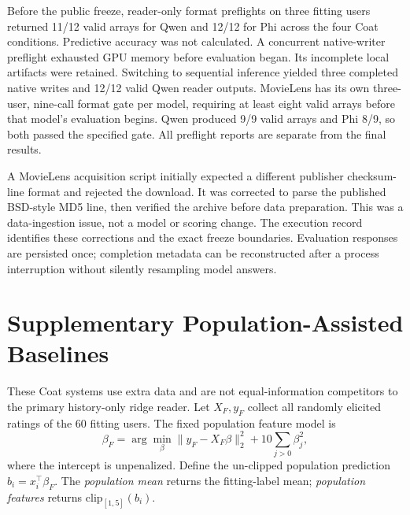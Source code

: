 Before the public freeze, reader-only format preflights on three fitting users returned 11/12 valid arrays for Qwen and 12/12 for Phi across the four Coat conditions. Predictive accuracy was not calculated. A concurrent native-writer preflight exhausted GPU memory before evaluation began. Its incomplete local artifacts were retained. Switching to sequential inference yielded three completed native writes and 12/12 valid Qwen reader outputs. MovieLens has its own three-user, nine-call format gate per model, requiring at least eight valid arrays before that model's evaluation begins. Qwen produced 9/9 valid arrays and Phi 8/9, so both passed the specified gate. All preflight reports are separate from the final results.

A MovieLens acquisition script initially expected a different publisher checksum-line format and rejected the download. It was corrected to parse the published BSD-style MD5 line, then verified the archive before data preparation. This was a data-ingestion issue, not a model or scoring change. The execution record identifies these corrections and the exact freeze boundaries. Evaluation responses are persisted once; completion metadata can be reconstructed after a process interruption without silently resampling model answers.

\section{Supplementary Population-Assisted Baselines}
\label{app:population}
These Coat systems use extra data and are not equal-information competitors to the primary history-only ridge reader. Let $X_F,y_F$ collect all randomly elicited ratings of the 60 fitting users. The fixed population feature model is
\begin{equation}
 \beta_F=\arg\min_{\beta}\|y_F-X_F\beta\|_2^2+10\sum_{j>0}\beta_j^2,
\end{equation}
where the intercept is unpenalized. Define the un-clipped population prediction $b_i=x_i^\top\beta_F$. The \emph{population mean} returns the fitting-label mean; \emph{population features} returns $\mathrm{clip}_{[1,5]}(b_i)$.

